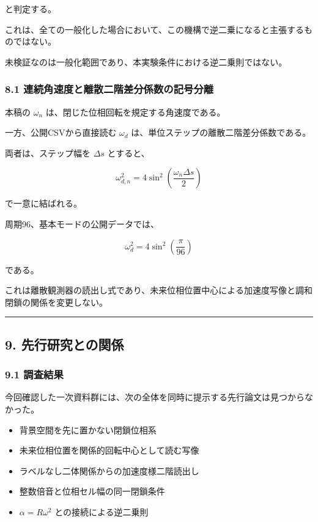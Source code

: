 \documentclass[
  a4paper,
]{ltjsarticle}
\providecommand{\tightlist}{%
  \setlength{\itemsep}{0pt}\setlength{\parskip}{0pt}}
\begin{document}
と判定する。

これは、全ての一般化した場合において、この機構で逆二乗になると主張するものではない。

未検証なのは一般化範囲であり、本実験条件における逆二乗則ではない。

\subsubsection{8.1
連続角速度と離散二階差分係数の記号分離}\label{ux9023ux7d9aux89d2ux901fux5ea6ux3068ux96e2ux6563ux4e8cux968eux5deeux5206ux4fc2ux6570ux306eux8a18ux53f7ux5206ux96e2}

本稿の \(\omega_n\) は、閉じた位相回転を規定する角速度である。

一方、公開CSVから直接読む \(\omega_d\)
は、単位ステップの離散二階差分係数である。

両者は、ステップ幅を \(\Delta s\) とすると、

\[
\omega_{d,n}^2
=4\sin^2\left(\frac{\omega_n\Delta s}{2}\right)
\]

で一意に結ばれる。

周期96、基本モードの公開データでは、

\[
\omega_d^2
=4\sin^2\left(\frac{\pi}{96}\right)
\]

である。

これは離散観測器の読出し式であり、未来位相位置中心による加速度写像と調和閉鎖の関係を変更しない。

\begin{center}\rule{0.5\linewidth}{0.5pt}\end{center}

\subsection{9.
先行研究との関係}\label{ux5148ux884cux7814ux7a76ux3068ux306eux95a2ux4fc2}

\subsubsection{9.1 調査結果}\label{ux8abfux67fbux7d50ux679c}

今回確認した一次資料群には、次の全体を同時に提示する先行論文は見つからなかった。

\begin{itemize}
\tightlist
\item
  背景空間を先に置かない閉鎖位相系
\item
  未来位相位置を関係的回転中心として読む写像
\item
  ラベルなし二体関係からの加速度様二階読出し
\item
  整数倍音と位相セル幅の同一閉鎖条件
\item
  \(\alpha=R\omega^2\) との接続による逆二乗則
\end{itemize}
\end{document}
